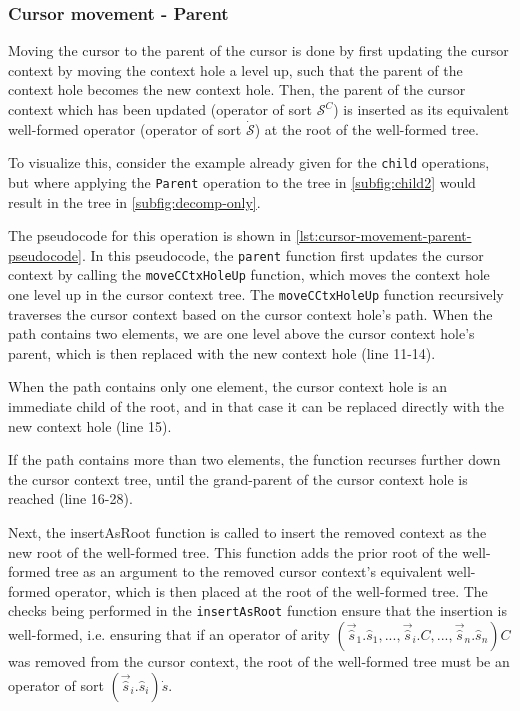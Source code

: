 \subsubsection{Cursor movement - Parent}

Moving the cursor to the parent of the cursor is done by first updating the cursor context
by moving the context hole a level up, such that the parent of the context hole
becomes the new context hole. Then, the parent of the cursor context which has
been updated (operator of sort $\mathcal{S}^C$) is inserted as its equivalent
well-formed operator (operator of sort $\dot{\mathcal{S}}$) at the root of the
well-formed tree.

To visualize this, consider the example already given for the \texttt{child} operations, but where applying the \texttt{Parent} operation to the tree in \cref{subfig:child2} would result in the tree in \cref{subfig:decomp-only}.

The pseudocode for this operation is shown in
\cref{lst:cursor-movement-parent-pseudocode}.
In this pseudocode, the \texttt{parent} function first updates the cursor
context by calling the \texttt{moveCCtxHoleUp} function, which moves the
context hole one level up in the cursor context tree.
The \texttt{moveCCtxHoleUp} function recursively traverses the cursor
context based on the cursor context hole's path. When the path contains
two elements, we are one level above the cursor context hole's parent, which
is then replaced with the new context hole (line 11-14).

When the path contains only one element, the cursor context hole is an immediate child of the root, and in that case it can be replaced directly
with the new context hole (line 15).

If the path contains more than two elements, the function recurses further
down the cursor context tree, until the grand-parent of the cursor context hole
is reached (line 16-28).

Next, the insertAsRoot function is called to insert the removed context as the
new root of the well-formed tree. This function adds the prior root of the
well-formed tree as an argument to the removed cursor context's equivalent
well-formed operator, which is then placed at the root of the well-formed tree.
The checks being performed in the \texttt{insertAsRoot} function ensure that the
insertion is well-formed, i.e. ensuring that if an operator of arity $(\vec{\hat{s}}_1.\hat{s}_1,...,\vec{\hat{s}}_i.C,...,\vec{\hat{s}}_n.\hat{s}_n)C$ was removed from the cursor context, the root of the well-formed tree must be an operator of sort $(\vec{\hat{s}}_i.\hat{s}_i)\dot{s}$.

